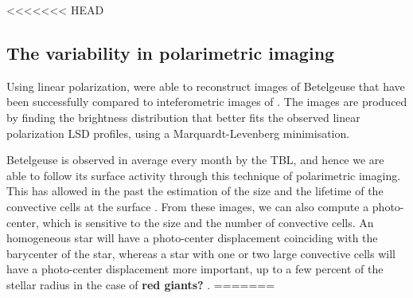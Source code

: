 \documentclass{aa}
\begin{document}


<<<<<<< HEAD
\subsection{The variability in polarimetric imaging}

Using linear polarization, \cite{lopez_ariste_convective_2018} were able to reconstruct images of Betelgeuse that have been successfully compared 
to inteferometric images of \cite{montarges_close_2016}. The images are produced by finding the brightness distribution that better fits the observed linear 
polarization LSD profiles, using a Marquardt-Levenberg minimisation.

Betelgeuse is observed in average every month by the TBL, and hence
we are able to follow its surface activity through this technique of polarimetric imaging. This has  allowed in the past the estimation of  
the size and the lifetime of the convective cells
at the surface \citep{lopez_ariste_convective_2018}. From these images, we can also compute a photo-center, which is sensitive to the size and the number of convective cells. 
An homogeneous star will have a photo-center displacement coinciding with the barycenter of the star, whereas a star with one or two large convective cells will have a
photo-center displacement more important, up to a few percent of the stellar radius in the case of \textbf{red giants?} \citep{chiavassa_probing_2022}. 
=======
\end{document}
